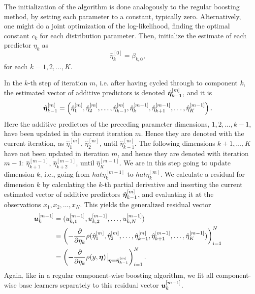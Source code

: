 The initialization of the algorithm is done analogously to the regular boosting method, by setting each parameter to a constant, typically zero.
Alternatively, one might do a joint optimization of the log-likelihood, finding the optimal constant $c_k$ for each distribution parameter.
Then, initialize the estimate of each predictor $\eta_k$ as
\begin{equation*}
    \hat{\eta}_k^{[0]}=\beta_{k,0},
\end{equation*}
for each $k=1,2,\ldots,K$.

In the $k$-th step of iteration $m$, i.e. after having cycled through to component $k$, the estimated vector of additive predictors is denoted $\hat{\boldsymbol{\eta}}_{k-1}^{[m]}$, and it is
\begin{equation*}
    \hat{\boldsymbol{\eta}}_{k-1}^{[m]}=\left(\hat{\eta}_1^{[m]},\hat{\eta}_2^{[m]},\ldots,\hat{\eta}_{k-1}^{[m]},\hat{\eta}_{k}^{[m-1]},\hat{\eta}_{k+1}^{[m-1]},\ldots,\hat{\eta}_{K}^{[m-1]}\right).
\end{equation*}
Here the additive predictors of the preceding parameter dimensions, $1,2,\ldots,k-1$, have been updated in the current iteration $m$.
Hence they are denoted with the current iteration, as $\hat{\eta}_1^{[m]}$, $\hat{\eta}_2^{[m]}$, until $\hat{\eta}_{k-1}^{[m]}$.
The following dimensions $k+1,\ldots,K$ have not been updated in iteration $m$, and hence they are denoted with iteration $m-1$:
$\hat{\eta}_{k+1}^{[m-1]}$, $\hat{\eta}_{k+2}^{[m-1]}$, until $\hat{\eta}_{K}^{[m-1]}$.
We are in this step going to update dimension $k$, i.e., going from $hat{\eta}_{k}^{[m-1]}$ to $hat{\eta}_{k}^{[m]}$.
We calculate a residual for dimension $k$ by calculating the $k$-th partial derivative and inserting the current estimated vector of additive predictors $\hat{\boldsymbol{\eta}}_{k-1}^{[m]}$, and evaluating it at the observations $x_1,x_2,\ldots,x_N$.
This yields the generalized residual vector
\begin{align*}
    \bm{u}_k^{[m-1]}&=(u_{k,1}^{[m-1]},u_{k,2}^{[m-1]},\ldots,u_{k,N}^{[m-1]})\\
    &=\left(-\frac{\partial}{\partial \eta_k}\rho(\hat{\eta}_1^{[m]},\hat{\eta}_2^{[m]},\ldots,\hat{\eta}_{k-1}^{[m]},\hat{\eta}_{k+1}^{[m-1]},\ldots,\hat{\eta}_{K}^{[m-1]})\right)_{i=1}^N \\
    &=\left(-\frac{\partial}{\partial \eta_k}\rho(y,\boldsymbol{\eta})\big\rvert_{\boldsymbol{\eta}=\hat{\boldsymbol{\eta}}_{k-1}^{[m]}}\right)_{i=1}^N.
\end{align*}
Again, like in a regular component-wise boosting algorithm, we fit all component-wise base learners separately to this residual vector $\bm{u}_k^{[m-1]}$.
